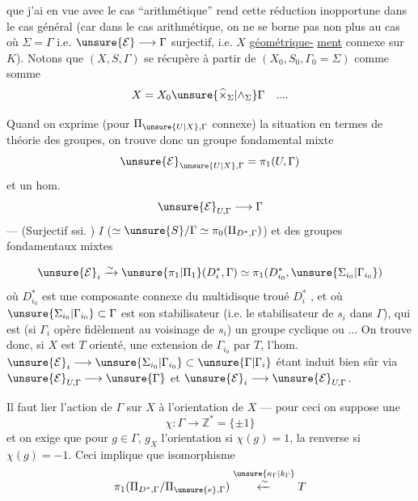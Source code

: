 que j'ai en vue avec le cas ``arithmétique''
rend cette réduction inopportune dans le
cas général (car dans le cas arithmétique,
on ne se borne pas non plus au cas où
$\Sigma=\Gamma$ i.e. $\unsure{\mathcal E}\longrightarrow\Gamma$ surjectif, i.e. 
$X$ \uline{géométrique-}
\uline{ment} connexe sur $K$). Notons  que
$(X,S,\Gamma)$ se récupère à partir de
$(X_0,S_0,\Gamma_0=\Sigma)$ comme somme 
\[
X=X_0\unsure{\widehat\times_{\Sigma}|\wedge_{\Sigma}}\Gamma\quad ....
\]

Quand on exprime (pour $\Pi_{\unsure{U|X},\Gamma}$ connexe)
la situation en termes de théorie des groupes,
on trouve donc  un groupe
fondamental  mixte
\[
\unsure{\mathcal E}_{\unsure{U|X},\Gamma}=\pi_1(U,\Gamma)
\]
et un hom.
\[
\unsure{\mathcal E}_{U,\Gamma}\longrightarrow\Gamma
\]
--- (Surjectif ssi. 
)
$I$ ($\simeq\unsure{S}/\Gamma\simeq\pi_0(\Pi_{D^*,\Gamma})$) et des
groupes fondamentaux mixtes

\[
\unsure{\mathcal E}_i\xrightarrow{\sim}\unsure{\pi_1|\Pi_1}(D_i^*,\Gamma)
\simeq\pi_1(D_{i_0}^*,\unsure{\Sigma_{i_0}|\Gamma_{i_0}})
\]
où $D_{i_0}^*$ est une composante connexe du
multidisque troué $D_i^*$ , et où $\unsure{\Sigma_{i_0}|\Gamma_{i_0}}\subset\Gamma$ est
son stabilisateur (i.e. le stabilisateur de
$s_i$ dans $\Gamma$), qui est  (si $\Gamma_i$  opère
fidèlement au voisinage de $s_i$) un groupe cyclique
ou  ... On trouve donc, si $X$ est
$T$ orienté, une extension de $\Gamma_{i_0}$ par $T$,
l'hom. $\unsure{\mathcal E}_i\longrightarrow\unsure{\Sigma_{i_0}|\Gamma_{i_0}}\subset\unsure{\Gamma|\Gamma_i}$ étant induit
bien sûr via $\unsure{\mathcal E}_{U,\Gamma}\longrightarrow\unsure{\Gamma}$ et $\unsure{\mathcal E}_i\longrightarrow\unsure{\mathcal E}_{U,\Gamma}$.

Il faut  lier l'action de $\Gamma$ sur $X$ à
l'orientation de $X$ --- pour ceci on suppose
 une 
\[
\chi:\Gamma\longrightarrow\mathbb Z^*=\{\pm1\}
\]
et on exige que pour $g\in\Gamma$, $g_X$ 
l'orientation si $\chi(g)=1$, la renverse si $\chi(g)=-1$.
Ceci implique que  isomorphisme
\[
\pi_1(\Pi_{D^*,\Gamma}/\Pi_{\unsure{e},\Gamma})
\overset{\unsure{\kappa_\Gamma|k_\Gamma}}{\xleftarrow{\sim}}T
\]

